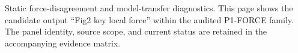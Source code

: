Static force-disagreement and model-transfer diagnostics. This page shows the candidate output ``Fig2 key local force'' within the audited P1-FORCE family. The panel identity, source scope, and current status are retained in the accompanying evidence matrix.
